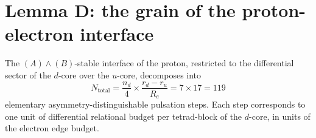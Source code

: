 \documentclass[12pt,a4paper]{article}
\theoremstyle{plain}
\theoremstyle{definition}
\theoremstyle{remark}
\newenvironment{theorembox}[1][]{%
  \begin{tcolorbox}[theoremstyle,title={Theorem\ifx\relax#1\relax\else: #1\fi}]}{\end{tcolorbox}}
\renewcommand{\Re}{R_e}
\newcommand{\ru}{r_u}
\newcommand{\rd}{r_d}
\newcommand{\Ntot}{N_{\mathrm{total}}}
\begin{document}
\section{Lemma D: the grain of the proton-electron interface}
\label{sec:lemmaD}

\begin{theorembox}[Lemma D — Interface grain]
\label{thm:LemmaD}
The $(A)\wedge(B)$-stable interface of the proton, restricted to the differential sector of the $d$-core over the $u$-core, decomposes into
\begin{equation}
\Ntot = \frac{n_d}{4} \times \frac{\rd - \ru}{\Re} = 7 \times 17 = 119
\label{eq:Ntot}
\end{equation}
elementary asymmetry-distinguishable pulsation steps. Each step corresponds to one unit of differential relational budget per tetrad-block of the $d$-core, in units of the electron edge budget.
\end{theorembox}
\end{document}

